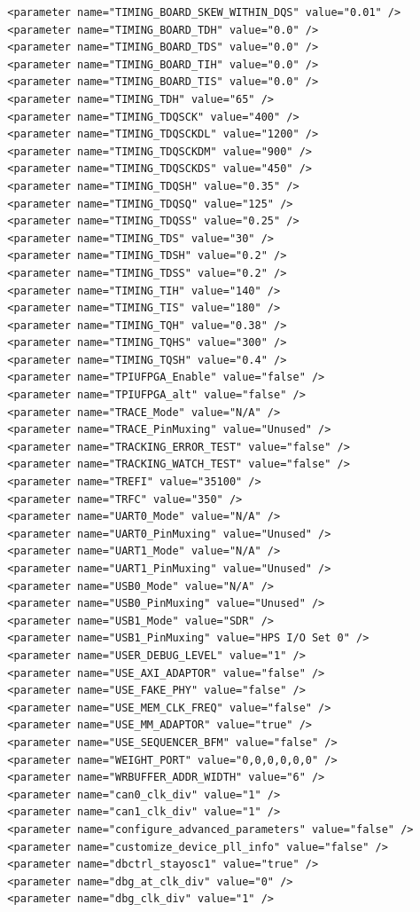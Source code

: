 \documentclass[conference]{IEEEtran}
\begin{document}
\begin{lstlisting}
  <parameter name="TIMING_BOARD_SKEW_WITHIN_DQS" value="0.01" />
  <parameter name="TIMING_BOARD_TDH" value="0.0" />
  <parameter name="TIMING_BOARD_TDS" value="0.0" />
  <parameter name="TIMING_BOARD_TIH" value="0.0" />
  <parameter name="TIMING_BOARD_TIS" value="0.0" />
  <parameter name="TIMING_TDH" value="65" />
  <parameter name="TIMING_TDQSCK" value="400" />
  <parameter name="TIMING_TDQSCKDL" value="1200" />
  <parameter name="TIMING_TDQSCKDM" value="900" />
  <parameter name="TIMING_TDQSCKDS" value="450" />
  <parameter name="TIMING_TDQSH" value="0.35" />
  <parameter name="TIMING_TDQSQ" value="125" />
  <parameter name="TIMING_TDQSS" value="0.25" />
  <parameter name="TIMING_TDS" value="30" />
  <parameter name="TIMING_TDSH" value="0.2" />
  <parameter name="TIMING_TDSS" value="0.2" />
  <parameter name="TIMING_TIH" value="140" />
  <parameter name="TIMING_TIS" value="180" />
  <parameter name="TIMING_TQH" value="0.38" />
  <parameter name="TIMING_TQHS" value="300" />
  <parameter name="TIMING_TQSH" value="0.4" />
  <parameter name="TPIUFPGA_Enable" value="false" />
  <parameter name="TPIUFPGA_alt" value="false" />
  <parameter name="TRACE_Mode" value="N/A" />
  <parameter name="TRACE_PinMuxing" value="Unused" />
  <parameter name="TRACKING_ERROR_TEST" value="false" />
  <parameter name="TRACKING_WATCH_TEST" value="false" />
  <parameter name="TREFI" value="35100" />
  <parameter name="TRFC" value="350" />
  <parameter name="UART0_Mode" value="N/A" />
  <parameter name="UART0_PinMuxing" value="Unused" />
  <parameter name="UART1_Mode" value="N/A" />
  <parameter name="UART1_PinMuxing" value="Unused" />
  <parameter name="USB0_Mode" value="N/A" />
  <parameter name="USB0_PinMuxing" value="Unused" />
  <parameter name="USB1_Mode" value="SDR" />
  <parameter name="USB1_PinMuxing" value="HPS I/O Set 0" />
  <parameter name="USER_DEBUG_LEVEL" value="1" />
  <parameter name="USE_AXI_ADAPTOR" value="false" />
  <parameter name="USE_FAKE_PHY" value="false" />
  <parameter name="USE_MEM_CLK_FREQ" value="false" />
  <parameter name="USE_MM_ADAPTOR" value="true" />
  <parameter name="USE_SEQUENCER_BFM" value="false" />
  <parameter name="WEIGHT_PORT" value="0,0,0,0,0,0" />
  <parameter name="WRBUFFER_ADDR_WIDTH" value="6" />
  <parameter name="can0_clk_div" value="1" />
  <parameter name="can1_clk_div" value="1" />
  <parameter name="configure_advanced_parameters" value="false" />
  <parameter name="customize_device_pll_info" value="false" />
  <parameter name="dbctrl_stayosc1" value="true" />
  <parameter name="dbg_at_clk_div" value="0" />
  <parameter name="dbg_clk_div" value="1" />

\end{lstlisting}
\end{document}
